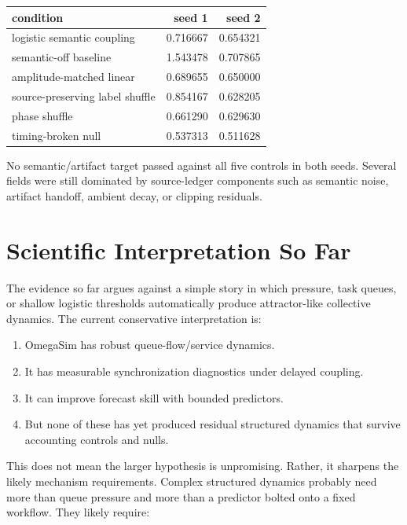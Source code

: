 \documentclass[11pt]{article}
\begin{document}
\begin{center}
\begin{tabular}{lrr}
condition & seed 1 & seed 2 \\
\hline
logistic semantic coupling & 0.716667 & 0.654321 \\
semantic-off baseline & 1.543478 & 0.707865 \\
amplitude-matched linear & 0.689655 & 0.650000 \\
source-preserving label shuffle & 0.854167 & 0.628205 \\
phase shuffle & 0.661290 & 0.629630 \\
timing-broken null & 0.537313 & 0.511628 \\
\end{tabular}
\end{center}

No semantic/artifact target passed against all five controls in both seeds.
Several fields were still dominated by source-ledger components such as
semantic noise, artifact handoff, ambient decay, or clipping residuals.

\section{Scientific Interpretation So Far}

The evidence so far argues against a simple story in which pressure, task
queues, or shallow logistic thresholds automatically produce attractor-like
collective dynamics. The current conservative interpretation is:

\begin{enumerate}
\item OmegaSim has robust queue-flow/service dynamics.
\item It has measurable synchronization diagnostics under delayed coupling.
\item It can improve forecast skill with bounded predictors.
\item But none of these has yet produced residual structured dynamics that
survive accounting controls and nulls.
\end{enumerate}

This does not mean the larger hypothesis is unpromising. Rather, it sharpens
the likely mechanism requirements. Complex structured dynamics probably need
more than queue pressure and more than a predictor bolted onto a fixed
workflow. They likely require:
\end{document}
